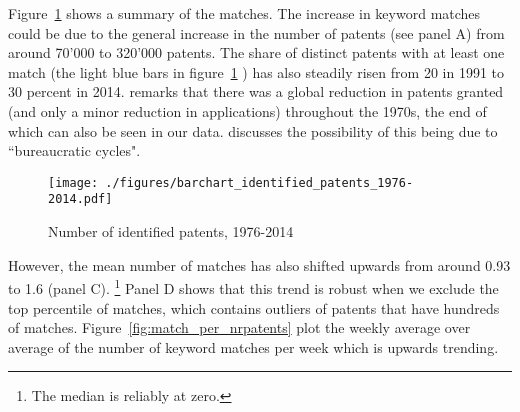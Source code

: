 \documentclass[11pt,a4paper]{article}
\begin{document}
Figure~\ref{fig:summary_stats} shows a summary of the matches. The increase in keyword matches could be due to the general increase in the number of patents (see panel A) from around 70'000 to 320'000 patents. The share of distinct patents with at least one match (the light blue bars in figure~\ref{fig:summary_stats} ) has also steadily risen from 20 in 1991 to 30 percent in 2014. \cite{G1998}  remarks that there was a global reduction in patents granted (and only a minor reduction in applications) throughout the 1970s, the end of which can also be seen in our data. \cite{G1998} discusses the possibility of this being due to ``bureaucratic cycles". 


\begin{figure}[tb]
\caption{Number of identified patents, 1976-2014}
	\texttt{[image: ./figures/barchart\_identified\_patents\_1976-2014.pdf]}
	\label{fig:summary_stats}
\end{figure}





However, the mean number of matches has also shifted upwards from around 0.93 to 1.6 (panel C). \footnote{The median is reliably at zero.} Panel D shows that this trend is robust when we exclude the top percentile of matches, which contains outliers of patents that have hundreds of matches. Figure~\ref{fig:match_per_nrpatents} plot the weekly average over average of the number of keyword matches per week which is upwards trending. 
\end{document}
